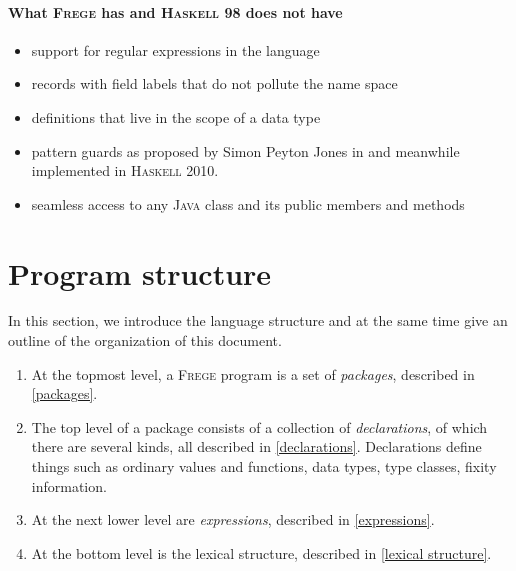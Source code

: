 \documentclass[lletterpaper,12pt]{report}
\newcommand{\haskell}[0]{\textsc{Haskell}}
\newcommand{\frege}[0]{\textsc{Frege}}
\newcommand{\java}[0]{\textsc{Java}}
\begin{document}

\paragraph{What \frege{} has and \haskell{} 98 does not have}
\begin{itemize}
\item support for regular expressions in the language
\item records with field labels that do not pollute the name space
\item definitions that live in the scope of a data type
\item pattern guards as proposed by Simon Peyton Jones in \cite{pguards}
and meanwhile implemented in \haskell{} 2010.
\item seamless access to any \java{} class and its public members and methods
\end{itemize}

\section{Program structure}

In this section, we introduce the language structure and at the
same time give an outline of the organization of this
document.

\begin{enumerate}

\item At the topmost level, a \frege{} program is a set of
\emph{packages}, described in \autoref{packages}.

\item The top level of a package consists of a collection of
\emph{declarations},
of which there are several kinds, all described in
\autoref{declarations}.
Declarations define things such as ordinary values and functions,
data types,
type classes, fixity information.

\item At the next lower level are \emph{expressions}, described in
\autoref{expressions}.

\item At the bottom level is the lexical structure, described in
\autoref{lexical structure}.

\end{enumerate}
\end{document}
